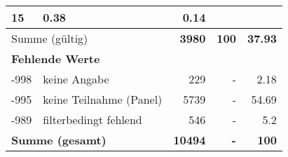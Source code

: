 \begin{longtable}{lXrrr}
       \num{15} &
       \num[round-mode=places,round-precision=2]{0,38} &
         \num[round-mode=places,round-precision=2]{0,14} \\
     \midrule
     \multicolumn{2}{l}{Summe (gültig)} &
       \textbf{\num{3980}} &
     \textbf{100} &
       \textbf{\num[round-mode=places,round-precision=2]{37,93}} \\
     \multicolumn{5}{l}{\textbf{Fehlende Werte}}\\
       -998 &
       keine Angabe &
         \num{229} &
        - &
         \num[round-mode=places,round-precision=2]{2,18} \\
       -995 &
       keine Teilnahme (Panel) &
         \num{5739} &
        - &
         \num[round-mode=places,round-precision=2]{54,69} \\
       -989 &
       filterbedingt fehlend &
         \num{546} &
        - &
         \num[round-mode=places,round-precision=2]{5,2} \\
     \midrule
     \multicolumn{2}{l}{\textbf{Summe (gesamt)}} &
          \textbf{\num{10494}} &
        \textbf{-} &
        \textbf{100} \\
     \bottomrule
     \end{longtable}
     
